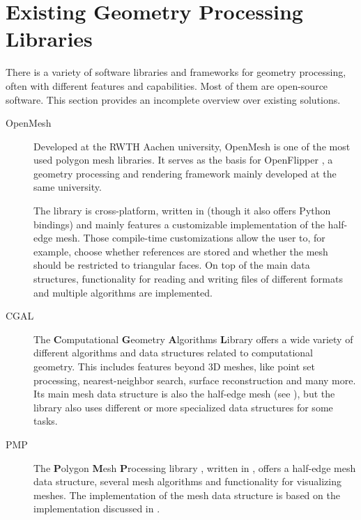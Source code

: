 \newpage
\section{Existing Geometry Processing Libraries}

There is a variety of software libraries and frameworks for geometry processing, often with different features and capabilities.
Most of them are open-source software.
This section provides an incomplete overview over existing solutions.

\begin{description}
  \item [OpenMesh] Developed at the RWTH Aachen university, OpenMesh \cite{botsch2002openmesh,openmeshhomepage} is one of the most used polygon mesh libraries.
  It serves as the basis for OpenFlipper \cite{mobius2010openflipper, openflipperhomepage}, a geometry processing and rendering framework mainly developed at the same university.

  The library is cross-platform, written in \cpp (though it also offers Python bindings) and mainly features a customizable implementation of the half-edge mesh.
  Those compile-time customizations allow the user to, for example, choose whether  references are stored and whether the mesh should be restricted to triangular faces.
  On top of the main data structures, functionality for reading and writing files of different formats and multiple algorithms are implemented.

  \item [CGAL] The \textbf{C}omputational \textbf{G}eometry \textbf{A}lgorithms \textbf{L}ibrary \cite{cgalhomepage} offers a wide variety of different algorithms and data structures related to computational geometry.
  This includes features beyond 3D meshes, like point set processing, nearest-neighbor search, surface reconstruction and many more.
  Its main mesh data structure is also the half-edge mesh (see \cite{cgal:k-hds-19a, cgal:bsmf-sm-19a}), but the library also uses different or more specialized data structures for some tasks.

  \item [PMP] The \textbf{P}olygon \textbf{M}esh \textbf{P}rocessing library \cite{pmp-library}, written in \cpp, offers a half-edge mesh data structure, several mesh algorithms and functionality for visualizing meshes.
  The implementation of the mesh data structure is based on the  implementation discussed in \cite{sieger2011design}.


\end{description}

